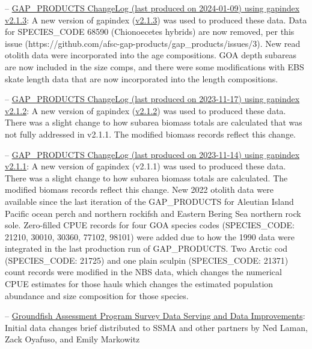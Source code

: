 \documentclass[
  letterpaper,
  oneside,
  open=any]{scrbook}
\begin{document}
--
\href{https://raw.githubusercontent.com/afsc-gap-products/gap_products/main/content/intro-news/2024-01-09.txt}{GAP\_PRODUCTS
ChangeLog (last produced on 2024-01-09) using gapindex v2.1.3}: A new
version of gapindex
(\href{https://github.com/afsc-gap-products/gapindex/releases/tag/v2.1.3}{v2.1.3})
was used to produced these data. Data for SPECIES\_CODE 68590
(Chionoecetes hybrids) are now removed, per this issue
(https://github.com/afsc-gap-products/gap\_products/issues/3). New read
otolith data were incorporated into the age compositions. GOA depth
subareas are now included in the size comps, and there were some
modifications with EBS skate length data that are now incorporated into
the length compositions.

--
\href{https://raw.githubusercontent.com/afsc-gap-products/gap_products/main/content/intro-news/2023-11-17.txt}{GAP\_PRODUCTS
ChangeLog (last produced on 2023-11-17) using gapindex v2.1.2}: A new
version of gapindex
(\href{https://github.com/afsc-gap-products/gapindex/releases/tag/v2.1.2}{v2.1.2})
was used to produced these data. There was a slight change to how
subarea biomass totals are calculated that was not fully addressed in
v2.1.1. The modified biomass records reflect this change.

--
\href{https://raw.githubusercontent.com/afsc-gap-products/gap_products/main/content/intro-news/2023-11-14_v2-1-1.txt}{GAP\_PRODUCTS
ChangeLog (last produced on 2023-11-14) using gapindex v2.1.1}: A new
version of gapindex (v2.1.1) was used to produced these data. There was
a slight change to how subarea biomass totals are calculated. The
modified biomass records reflect this change. New 2022 otolith data were
available since the last iteration of the GAP\_PRODUCTS for Aleutian
Island Pacific ocean perch and northern rockifsh and Eastern Bering Sea
northern rock sole. Zero-filled CPUE records for four GOA species codes
(SPECIES\_CODE: 21210, 30010, 30360, 77102, 98101) were added due to how
the 1990 data were integrated in the last production run of
GAP\_PRODUCTS. Two Arctic cod (SPECIES\_CODE: 21725) and one plain
sculpin (SPECIES\_CODE: 21371) count records were modified in the NBS
data, which changes the numerical CPUE estimates for those hauls which
changes the estimated population abundance and size composition for
those species.

--
\href{https://raw.githubusercontent.com/afsc-gap-products/gap_products/main/content/intro-news/2023-06-20_datachangesbreif}{Groundfish
Assessment Program Survey Data Serving and Data Improvements}: Initial
data changes brief distributed to SSMA and other partners by Ned Laman,
Zack Oyafuso, and Emily Markowitz
\end{document}
